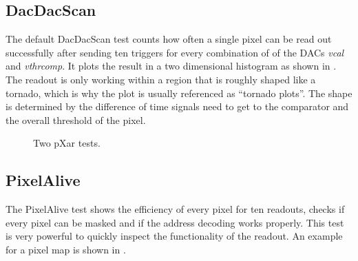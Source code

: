 \documentclass[british,11pt,a4paper]{memoir}
\begin{document}
\subsection{DacDacScan}\label{stornado}
The default DacDacScan test counts how often a single pixel can be read out successfully after sending ten triggers for every combination of of the \ac{DAC}s \textit{vcal} and \textit{vthrcomp}. It plots the result in a two dimensional histogram as shown in . The readout is only working within a region that is roughly shaped like a tornado, which is why the plot is usually referenced as ``tornado plots''. The shape is determined by the difference of time signals  need to get to the comparator and the overall threshold of the pixel. 
\begin{figure}[ht]
	\centering
	\hfill
	\caption{Two pXar tests.}
	\label{ppxartest}
\end{figure}\no
\subsection{PixelAlive}
The PixelAlive test shows the efficiency of every pixel for ten readouts, checks if every pixel can be masked and if the address decoding works properly. This test is very powerful to quickly inspect the functionality of the readout. An example for a pixel map is shown in .
\end{document}
